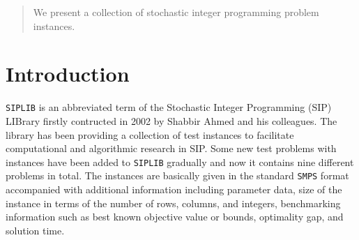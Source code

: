 \author{Yongkyu Cho \and 
		Kibaek Kim \and
        Cong Han Lim \and
        James Luedtke \and
        Jeffrey Linderoth
}



\date{Received: date / Accepted: date}


\maketitle

\begin{abstract}
We present a collection of stochastic integer programming problem instances.
\end{abstract}

\section{Introduction}
\texttt{SIPLIB} \cite{web:SIPLIB1} is an abbreviated term of the Stochastic Integer Programming (SIP) LIBrary firstly contructed in 2002 by Shabbir Ahmed and his colleagues. The library has been providing a collection of test instances to facilitate computational and algorithmic research in SIP. Some new test problems with instances have been added to \texttt{SIPLIB} gradually and now it contains nine different problems in total.  The instances are basically given in the standard \texttt{SMPS} format accompanied with additional information including parameter data, size of the instance in terms of the number of rows, columns, and integers, benchmarking information such as best known objective value or bounds, optimality gap, and solution time.

